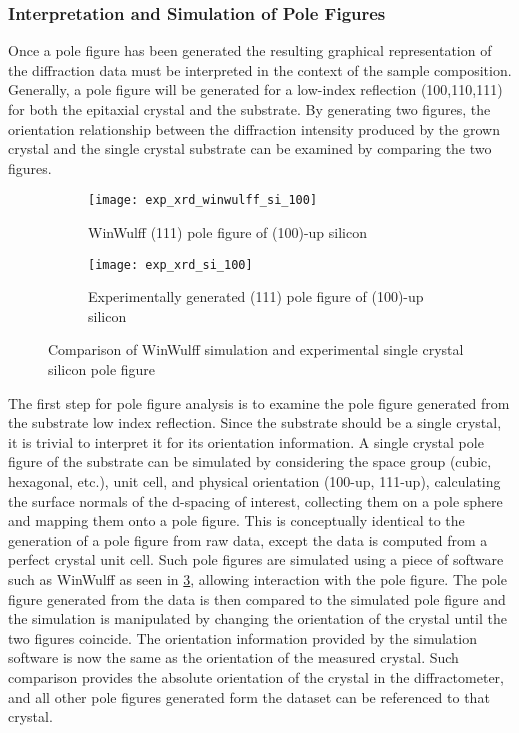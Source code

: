 \subsubsection{Interpretation and Simulation of Pole Figures} Once a pole figure has been generated the resulting graphical representation of the diffraction data must be interpreted in the context of the sample composition.
Generally, a pole figure will be generated for a low-index reflection (100,110,111) for both the epitaxial crystal and the substrate.
By generating two figures, the orientation relationship between the diffraction intensity produced by the grown crystal and the single crystal substrate can be examined by comparing the two figures.
\begin{figure}
 \centering \centering
 \begin{subfigure}[t]{0.55\textwidth}
  \centering \texttt{[image: exp\_xrd\_winwulff\_si\_100]}
  \caption{\label{fig:exp_xrd_winwulff_si_100}WinWulff (111) pole figure of (100)-up silicon}
 \end{subfigure}%
 \begin{subfigure}[t]{0.45\textwidth}
  \centering \texttt{[image: exp\_xrd\_si\_100]}
  \caption{\label{fig:exp_xrd_si_100}Experimentally generated (111) pole figure of (100)-up silicon}
 \end{subfigure}
 \caption{\label{fig:exp_xray_winwulff}Comparison of WinWulff simulation and experimental single crystal silicon pole figure}
\end{figure}

The first step for pole figure analysis is to examine the pole figure generated from the substrate low index reflection.
Since the substrate should be a single crystal, it is trivial to interpret it for its orientation information.
A single crystal pole figure of the substrate can be simulated by considering the space group (cubic, hexagonal, etc.), unit cell, and physical orientation (100-up, 111-up), calculating the surface normals of the d-spacing of interest, collecting them on a pole sphere and mapping them onto a pole figure.
This is conceptually identical to the generation of a pole figure from raw data, except the data is computed from a perfect crystal unit cell.
Such pole figures are simulated using a piece of software such as WinWulff\cite{Weber2006} as seen in \cref{fig:exp_xray_winwulff}, allowing interaction with the pole figure.
The pole figure generated from the data is then compared to the simulated pole figure and the simulation is manipulated by changing the orientation of the crystal until the two figures coincide.
The orientation information provided by the simulation software is now the same as the orientation of the measured crystal.
Such comparison provides the absolute orientation of the crystal in the diffractometer, and all other pole figures generated form the dataset can be referenced to that crystal.

